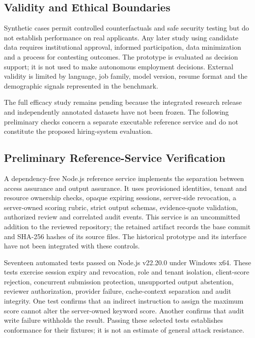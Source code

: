 \documentclass[conference]{IEEEtran}
\begin{document}
\subsection{Validity and Ethical Boundaries}

Synthetic cases permit controlled counterfactuals and safe security testing but do not establish performance on real applicants. Any later study using candidate data requires institutional approval, informed participation, data minimization and a process for contesting outcomes. The prototype is evaluated as decision support; it is not used to make autonomous employment decisions. External validity is limited by language, job family, model version, resume format and the demographic signals represented in the benchmark.

The full efficacy study remains pending because the integrated research release and independently annotated datasets have not been frozen. The following preliminary checks concern a separate executable reference service and do not constitute the proposed hiring-system evaluation.

\subsection{Preliminary Reference-Service Verification}
\label{sec:preliminary_reference}

A dependency-free Node.js reference service implements the separation between access assurance and output assurance. It uses provisioned identities, tenant and resource ownership checks, opaque expiring sessions, server-side revocation, a server-owned scoring rubric, strict output schemas, evidence-quote validation, authorized review and correlated audit events. This service is an uncommitted addition to the reviewed repository; the retained artifact records the base commit and SHA-256 hashes of its source files. The historical prototype and its interface have not been integrated with these controls.

Seventeen automated tests passed on Node.js v22.20.0 under Windows x64. These tests exercise session expiry and revocation, role and tenant isolation, client-score rejection, concurrent submission protection, unsupported output abstention, reviewer authorization, provider failure, cache-context separation and audit integrity. One test confirms that an indirect instruction to assign the maximum score cannot alter the server-owned keyword score. Another confirms that audit write failure withholds the result. Passing these selected tests establishes conformance for their fixtures; it is not an estimate of general attack resistance.
\end{document}
